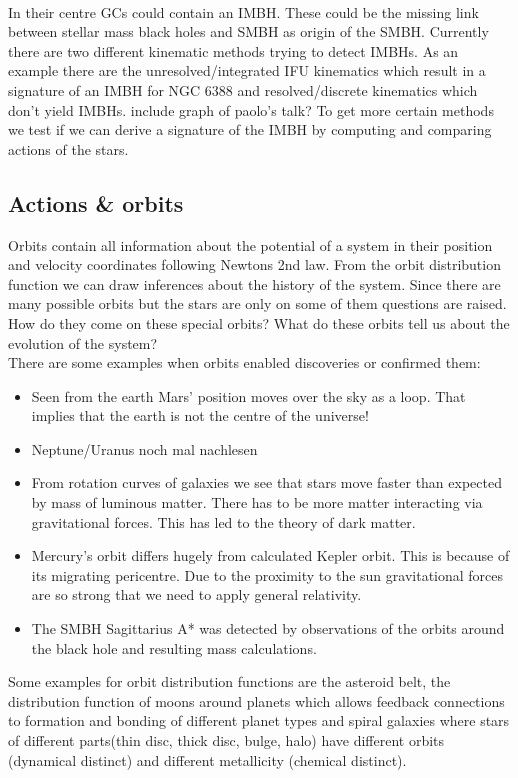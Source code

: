 \\In their centre \ac{GC}s could contain an \ac{IMBH}. These could be the missing link between stellar mass black holes and \ac{SMBH} as origin of the \ac{SMBH}. Currently there are two different kinematic methods trying to detect \ac{IMBH}s. As an example there are the unresolved/integrated IFU kinematics which result in a signature of an \ac{IMBH} for NGC 6388 and resolved/discrete kinematics which don't yield \ac{IMBH}s. \color{red} include graph of paolo's talk? \color{black} To get more certain methods we test if we can derive a signature of the \ac{IMBH} by computing and comparing actions of the stars.


\subsection{Actions \& orbits}
Orbits contain all information about the potential of a system in their position and velocity coordinates following Newtons 2nd law. From the orbit distribution function we can draw inferences about the history of the system. Since there are many possible orbits but the stars are only on some of them questions are raised. How do they come on these special orbits? What do these orbits tell us about the evolution of the system? 
\\There are some examples when orbits enabled discoveries or confirmed them: 
\begin{itemize}
\item Seen from the earth Mars' position moves over the sky as a loop. That implies that the earth is not the centre of the universe!
\item Neptune/Uranus \color{red} noch mal nachlesen \color{black}
\item From rotation curves of galaxies we see that stars move faster than expected by mass of luminous matter. There has to be more matter interacting via gravitational forces. This has led to the theory of dark matter.
\item Mercury's orbit differs hugely from calculated Kepler orbit. This is because of its migrating pericentre. Due to the proximity to the sun gravitational forces are so strong that we need to apply general relativity.
\item The \ac{SMBH} Sagittarius A*  was detected by observations of the orbits around the black hole and resulting mass calculations.
\end{itemize}
Some examples for orbit distribution functions are the asteroid belt, the distribution function of moons around planets which allows feedback connections to formation and bonding of different planet types and spiral galaxies where stars of different parts(thin disc, thick disc, bulge, halo) have different orbits (dynamical distinct) and different metallicity (chemical distinct).
